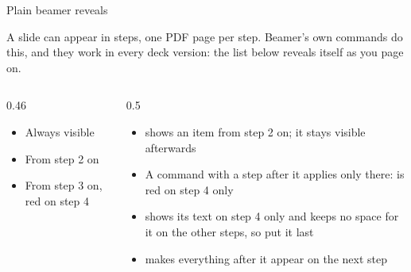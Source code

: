 
\begin{standardframe}{Plain beamer reveals}
	{\small A slide can appear in steps, one PDF page per step. Beamer's own
	commands do this, and they work in every deck version: the list below reveals
	itself as you page on.\par}
	\begin{columns}[T,onlytextwidth]
		\begin{column}{0.46\linewidth}
			\begin{itemize}
				\item Always visible
				\item<2-> From step 2 on
				\item<3-> From step 3 on, \textcolor<4>{c_custom_red}{red} on step 4
			\end{itemize}
			\smallskip
		\end{column}
		\begin{column}{0.5\linewidth}
			\begin{itemize}
				\item {} shows an item from step 2 on; it stays visible afterwards
				\item A command with a step after it applies only there:  is red on step 4 only
				\item {} shows its text on step 4 only and keeps no space for it on the other steps, so put it last
				\item {} makes everything after it appear on the next step
			\end{itemize}
		\end{column}
	\end{columns}
\end{standardframe}
